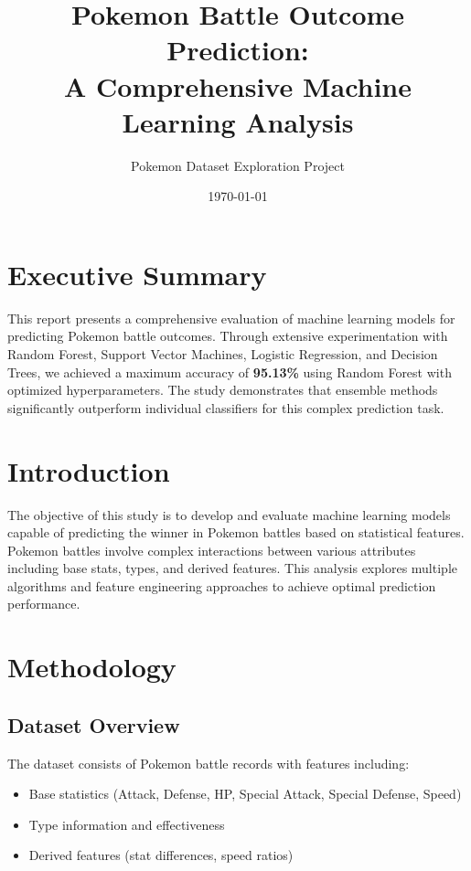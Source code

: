 \documentclass[12pt,a4paper]{article}
\title{\textbf{Pokemon Battle Outcome Prediction: \\
A Comprehensive Machine Learning Analysis}}
\author{Pokemon Dataset Exploration Project}
\date{\today}
\begin{document}
\maketitle

\tableofcontents
\newpage

\section{Executive Summary}

This report presents a comprehensive evaluation of machine learning models for predicting Pokemon battle outcomes. Through extensive experimentation with Random Forest, Support Vector Machines, Logistic Regression, and Decision Trees, we achieved a maximum accuracy of \textbf{95.13\%} using Random Forest with optimized hyperparameters. The study demonstrates that ensemble methods significantly outperform individual classifiers for this complex prediction task.

\section{Introduction}

The objective of this study is to develop and evaluate machine learning models capable of predicting the winner in Pokemon battles based on statistical features. Pokemon battles involve complex interactions between various attributes including base stats, types, and derived features. This analysis explores multiple algorithms and feature engineering approaches to achieve optimal prediction performance.

\section{Methodology}

\subsection{Dataset Overview}
The dataset consists of Pokemon battle records with features including:
\begin{itemize}
    \item Base statistics (Attack, Defense, HP, Special Attack, Special Defense, Speed)
    \item Type information and effectiveness
    \item Derived features (stat differences, speed ratios)
\end{itemize}
\end{document}
